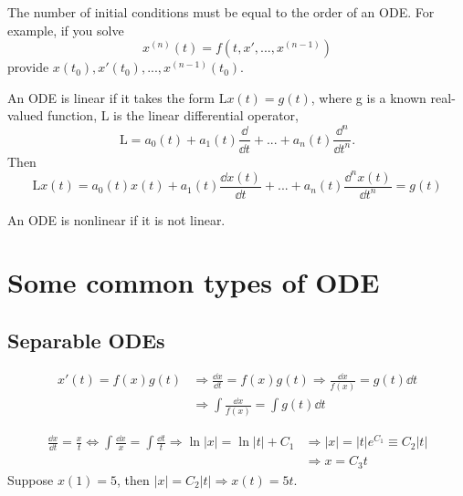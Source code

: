 \documentclass[twoside]{article}
\begin{document}
The number of initial conditions must be equal to the order of an ODE. For example, if you solve 
$$
x^{(n)}(t) = f(t, x', ..., x^{(n-1)})
$$
provide $x(t_0),x'(t_0), ..., x^{(n-1)}(t_0).$

\begin{definition}
    An ODE is linear if it takes the form $\mathrm{L}x(t) = g(t)$, where g is a known real-valued function, L is the linear differential operator,
    \[
    \mathrm{L} = a_0(t) + a_1(t)\frac{\dd }{\dd t}+ ... + a_n(t)\frac{\dd^n }{\dd t^n}.
    \]
    Then $$\mathrm{L}x(t) = a_0(t) x(t) + a_1(t)\frac{\dd x(t)}{\dd t}+ ... + a_n(t)\frac{\dd^n x(t)}{\dd t^n} = g(t)$$
\end{definition}

\begin{definition}
    An ODE is nonlinear if it is not linear.
\end{definition}

\section{Some common types of ODE}
\subsection{Separable ODEs}
\begin{equation}
    \begin{aligned}
        x'(t) = f(x)g(t) &\Longrightarrow \frac{\dd x}{\dd t} = f(x)g(t) \Longrightarrow
        \frac{\dd x}{f(x)}  = g(t) \dd t\\
        &\Longrightarrow \int \frac{\dd x}{f(x)}  = \int g(t) \dd t
    \end{aligned}
\end{equation}

\begin{example}
    \begin{equation}
    \begin{aligned}
        \frac{\dd x}{\dd t} = \frac{x}{t} \iff \int \frac{\dd x}{x} = \int \frac{ \dd t}{t}
        \Longrightarrow 
        \ln |x| = \ln |t| + C_1
        &\Longrightarrow 
        |x| = |t| e^{C_1} \equiv C_2 |t|\\
        &\Longrightarrow x = C_3 t
    \end{aligned}
    \end{equation}
    Suppose $x(1) = 5$, then $|x| = C_2 |t| \Longrightarrow x(t) = 5t$.
\end{example}
\end{document}
